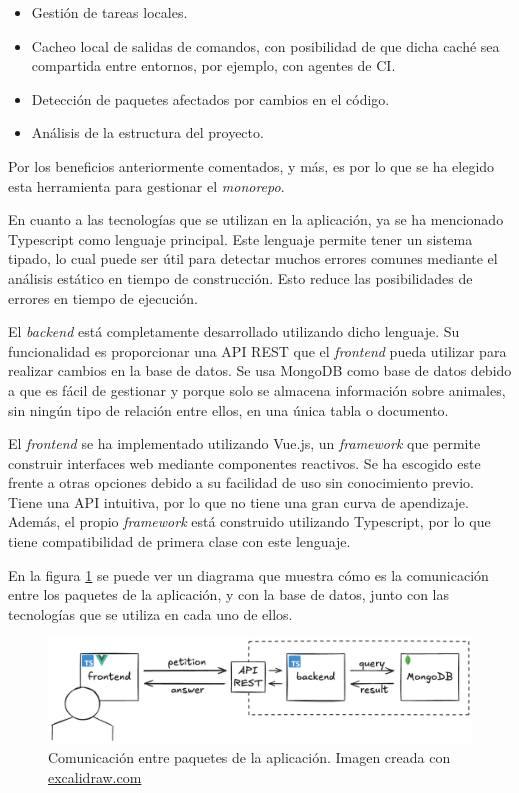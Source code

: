 \begin{itemize}
  \item Gestión de tareas locales.
  \item Cacheo local de salidas de comandos, con posibilidad de que dicha caché sea compartida entre entornos, por ejemplo, con agentes de CI.
  \item Detección de paquetes afectados por cambios en el código.
  \item Análisis de la estructura del proyecto.
\end{itemize}

Por los beneficios anteriormente comentados, y más, es por lo que se ha elegido esta herramienta para gestionar el \textit{monorepo}.

En cuanto a las tecnologías que se utilizan en la aplicación, ya se ha mencionado Typescript como lenguaje principal. Este lenguaje permite tener un sistema tipado, lo cual puede ser útil para detectar muchos errores comunes mediante el análisis estático en tiempo de construcción. Esto reduce las posibilidades de errores en tiempo de ejecución.

El \textit{backend} está completamente desarrollado utilizando dicho lenguaje. Su funcionalidad es proporcionar una API REST que el \textit{frontend} pueda utilizar para realizar cambios en la base de datos. Se usa MongoDB\cite{mongodb} como base de datos debido a que es fácil de gestionar y porque solo se almacena información sobre animales, sin ningún tipo de relación entre ellos, en una única tabla o documento.

El \textit{frontend} se ha implementado utilizando Vue.js\cite{vue}, un \textit{framework} que permite construir interfaces web mediante componentes reactivos. Se ha escogido este frente a otras opciones debido a su facilidad de uso sin conocimiento previo. Tiene una API intuitiva, por lo que no tiene una gran curva de apendizaje. Además, el propio \textit{framework} está construido utilizando Typescript, por lo que tiene compatibilidad de primera clase con este lenguaje.

En la figura \ref{fig:app} se puede ver un diagrama que muestra cómo es la comunicación entre los paquetes de la aplicación, y con la base de datos, junto con las tecnologías que se utiliza en cada uno de ellos.

\begin{figure}
  \centerline{\includegraphics[width=15cm]{figuras/app}}
  \caption{Comunicación entre paquetes de la aplicación. Imagen creada con \href{https://excalidraw.com}{excalidraw.com}}
  \label{fig:app}
\end{figure}

